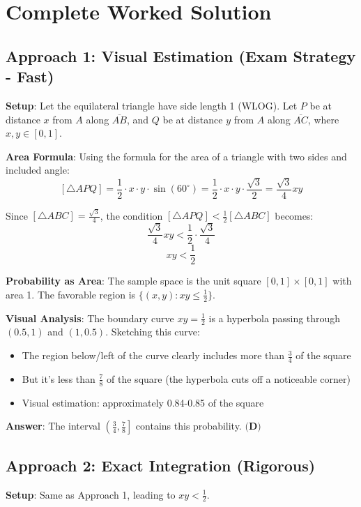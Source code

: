 \documentclass[11pt]{article}
\begin{document}
\section*{Complete Worked Solution}

\subsection*{Approach 1: Visual Estimation (Exam Strategy - Fast)}

\textbf{Setup}: Let the equilateral triangle have side length 1 (WLOG). Let $P$ be at distance $x$ from $A$ along $\overline{AB}$, and $Q$ be at distance $y$ from $A$ along $\overline{AC}$, where $x, y \in [0,1]$.

\textbf{Area Formula}: Using the formula for the area of a triangle with two sides and included angle:
\[[\triangle APQ] = \frac{1}{2} \cdot x \cdot y \cdot \sin(60^\circ) = \frac{1}{2} \cdot x \cdot y \cdot \frac{\sqrt{3}}{2} = \frac{\sqrt{3}}{4}xy\]

Since $[\triangle ABC] = \frac{\sqrt{3}}{4}$, the condition $[\triangle APQ] < \frac{1}{2}[\triangle ABC]$ becomes:
\[\frac{\sqrt{3}}{4}xy < \frac{1}{2} \cdot \frac{\sqrt{3}}{4}\]
\[xy < \frac{1}{2}\]

\textbf{Probability as Area}: The sample space is the unit square $[0,1] \times [0,1]$ with area 1. The favorable region is $\{(x,y): xy \leq \frac{1}{2}\}$.

\textbf{Visual Analysis}: The boundary curve $xy = \frac{1}{2}$ is a hyperbola passing through $(0.5, 1)$ and $(1, 0.5)$. Sketching this curve:
\begin{itemize}
    \item The region below/left of the curve clearly includes more than $\frac{3}{4}$ of the square
    \item But it's less than $\frac{7}{8}$ of the square (the hyperbola cuts off a noticeable corner)
    \item Visual estimation: approximately 0.84-0.85 of the square
\end{itemize}

\textbf{Answer}: The interval $\left(\frac{3}{4}, \frac{7}{8}\right]$ contains this probability. $\boxed{\textbf{(D)}}$

\subsection*{Approach 2: Exact Integration (Rigorous)}

\textbf{Setup}: Same as Approach 1, leading to $xy < \frac{1}{2}$.
\end{document}
